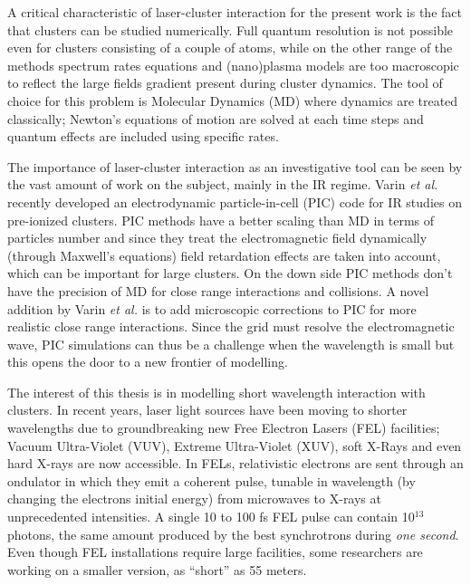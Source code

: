 A critical characteristic of laser-cluster interaction for the present
work is the fact that clusters can be studied numerically. Full quantum resolution
is not possible even for clusters consisting of a couple of atoms, while on the
other range of the methods spectrum rates equations and (nano)plasma models are
too macroscopic to reflect the large fields gradient present during cluster
dynamics\cite{Fennel2010}. The tool of choice for this problem is Molecular Dynamics
(MD) where dynamics are treated classically; Newton's equations of motion are
solved at each time steps and quantum effects are included using specific rates.

The importance of laser-cluster interaction as an investigative tool
can be seen by the vast amount of work on the subject, mainly
in the IR regime\cite{Fennel2010}. Varin \textit{et al.}\cite{Varin2012}
recently developed an electrodynamic
particle-in-cell (PIC) code for IR studies on pre-ionized clusters. PIC methods
have a better scaling than MD in terms of particles number and since they treat
the electromagnetic field dynamically (through Maxwell's equations) field
retardation effects are taken into account, which can be important for large
clusters. On the down side PIC methods don't have the precision of MD for close
range interactions and collisions. A novel addition by Varin \textit{et al.}
is to add microscopic corrections to PIC for more realistic close range
interactions\cite{Peltz2012}.
Since the grid must resolve the electromagnetic wave,
PIC simulations can thus be a challenge when the wavelength is small
but this opens the door to a new frontier of modelling.

The interest of this thesis is in modelling short wavelength interaction with
clusters. In recent years, laser light sources have been moving to shorter
wavelengths due to groundbreaking new Free Electron Lasers (FEL)
facilities; Vacuum Ultra-Violet (VUV), Extreme Ultra-Violet (XUV), soft X-Rays
and even hard X-rays are now accessible. In FELs, relativistic electrons are sent
through an ondulator in which they emit a coherent pulse, tunable in wavelength
(by changing the electrons initial energy)
from microwaves to X-rays\cite{Brabec2009,Ackermann2007a,Pellegrini2012} at
unprecedented intensities. A single 10 to 100 fs FEL pulse can contain 10$^{13}$
photons, the same amount produced by the best synchrotrons during
\textit{one second}\cite{Bostedt2009}. Even though FEL installations require
large facilities, some researchers are working on a smaller version, as
``short'' as 55 meters\cite{Shintake2008}.

